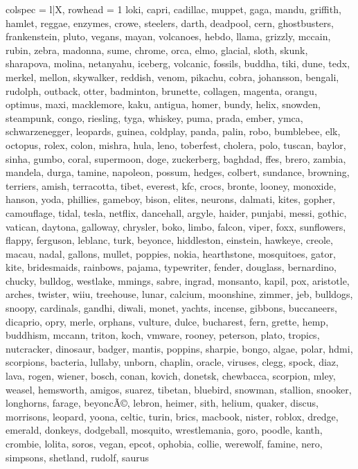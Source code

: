 \begin{tblr}[
  long,
  caption = {Examples from SNLI.},
  entry = {Short Caption},
  label = {tblr:test},
]{
colspec = {l|X},
rowhead = 1}
loki, capri, cadillac, muppet, gaga, mandu, griffith, hamlet, reggae, enzymes, crowe, steelers, darth, deadpool, cern, ghostbusters, frankenstein, pluto, vegans, mayan, volcanoes, hebdo, llama, grizzly, mccain, rubin, zebra, madonna, sume, chrome, orca, elmo, glacial, sloth, skunk, sharapova, molina, netanyahu, iceberg, volcanic, fossils, buddha, tiki, dune, tedx, merkel, mellon, skywalker, reddish, venom, pikachu, cobra, johansson, bengali, rudolph, outback, otter, badminton, brunette, collagen, magenta, orangu, optimus, maxi, macklemore, kaku, antigua, homer, bundy, helix, snowden, steampunk, congo, riesling, tyga, whiskey, puma, prada, ember, ymca, schwarzenegger, leopards, guinea, coldplay, panda, palin, robo, bumblebee, elk, octopus, rolex, colon, mishra, hula, leno, toberfest, cholera, polo, tuscan, baylor, sinha, gumbo, coral, supermoon, doge, zuckerberg, baghdad, ffes, brero, zambia, mandela, durga, tamine, napoleon, possum, hedges, colbert, sundance, browning, terriers, amish, terracotta, tibet, everest, kfc, crocs, bronte, looney, monoxide, hanson, yoda, phillies, gameboy, bison, elites, neurons, dalmati, kites, gopher, camouflage, tidal, tesla, netflix, dancehall, argyle, haider, punjabi, messi, gothic, vatican, daytona, galloway, chrysler, boko, limbo, falcon, viper, foxx, sunflowers, flappy, ferguson, leblanc, turk, beyonce, hiddleston, einstein, hawkeye, creole, macau, nadal, gallons, mullet, poppies, nokia, hearthstone, mosquitoes, gator, kite, bridesmaids, rainbows, pajama, typewriter, fender, douglass, bernardino, chucky, bulldog, westlake, mmings, sabre, ingrad, monsanto, kapil, pox, aristotle, arches, twister, wiiu, treehouse, lunar, calcium, moonshine, zimmer, jeb, bulldogs, snoopy, cardinals, gandhi, diwali, monet, yachts, incense, gibbons, buccaneers, dicaprio, opry, merle, orphans, vulture, dulce, bucharest, fern, grette, hemp, buddhism, mccann, triton, koch, vmware, rooney, peterson, plato, tropics, nutcracker, dinosaur, badger, mantis, poppins, sharpie, bongo, algae, polar, hdmi, scorpions, bacteria, lullaby, unborn, chaplin, oracle, viruses, clegg, spock, diaz, lava, rogen, wiener, bosch, conan, kovich, donetsk, chewbacca, scorpion, mley, weasel, hemsworth, amigos, suarez, tibetan, bluebird, snowman, stallion, snooker, longhorns, farage, beyoncÃ©, lebron, heimer, sith, helium, quaker, discus, morrisons, leopard, yoona, celtic, turin, brics, macbook, nister, roblox, dredge, emerald, donkeys, dodgeball, mosquito, wrestlemania, goro, poodle, kanth, crombie, lolita, soros, vegan, epcot, ophobia, collie, werewolf, famine, nero, simpsons, shetland, rudolf, saurus \\\midrule

\end{tblr}
